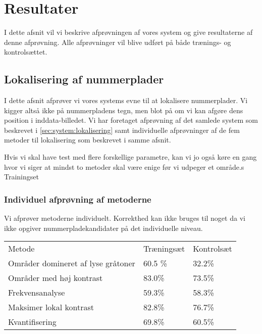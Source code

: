 \section{Resultater}
\label{sec:resultater}

I dette afsnit vil vi beskrive afprøvningen af vores system og give resultaterne af denne afprøvning. Alle afprøvninger vil blive udført på både trænings- og kontrolsættet.


\subsection{Lokalisering af nummerplader}
I dette afsnit afprøver vi vores systems evne til at lokalisere nummerplader. Vi kigger altså ikke på nummerpladens tegn, men blot på om vi kan afgøre dens position i inddata-billedet. Vi har foretaget afprøvning af det samlede system som beskrevet i \vref{sec:system:lokalisering} samt individuelle afprøvninger af de fem metoder til lokalisering som beskrevet i samme afsnit.

Hvis vi skal have test med flere forskellige parametre, kan vi jo også køre en gang hvor vi siger at mindst to metoder skal være enige før vi udpeger et område.s
Trainingset


\subsubsection{Individuel afprøvning af metoderne}
Vi afprøver metoderne individuelt. Korrekthed kan ikke bruges til noget da vi ikke opgiver nummerpladekandidater på det individuelle niveau.
\begin{center}
\begin{tabular}{|l|l|l|}
\hline
\rowcolor[gray]{0.9} \multicolumn{3}{|>{\columncolor[gray]{0.9}}c|}{\textbf{..}} \\ \hline
Metode & Træningsæt & Kontrolsæt\\ \hline
Områder domineret af lyse gråtoner &  60.5 \% & 32.2\%\\ \hline
Områder med høj kontrast & 83.0\% & 73.5\%\\ \hline
Frekvensanalyse &  59.3\% & 58.3\%\\ \hline
Maksimer lokal kontrast &  82.8\% & 76.7\%\\ \hline
Kvantifisering &  69.8\% & 60.5\%\\
\hline
\end{tabular}
\end{center}


